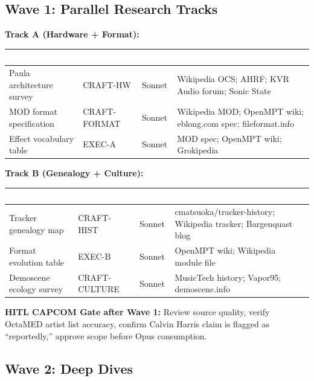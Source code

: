 \documentclass[11pt,letterpaper]{article}
\newcommand{\tableheader}[1]{\textbf{\sffamily\textcolor{white}{#1}}}
\begin{document}
\subsection{Wave 1: Parallel Research Tracks}

\textbf{Track A (Hardware + Format):}

\begin{center}
\begin{tabularx}{\textwidth}{L{3cm}L{2.5cm}C{2cm}X}
\toprule
{}
\tableheader{Task} & \tableheader{Agent} & \tableheader{Model} & \tableheader{Key Sources} \\
\midrule
Paula architecture survey & CRAFT-HW & Sonnet & Wikipedia OCS; AHRF; KVR Audio forum; Sonic State \\
MOD format specification & CRAFT-FORMAT & Sonnet & Wikipedia MOD; OpenMPT wiki; eblong.com spec; fileformat.info \\
Effect vocabulary table & EXEC-A & Sonnet & MOD spec; OpenMPT wiki; Grokipedia \\
\bottomrule
\end{tabularx}
\end{center}

\textbf{Track B (Genealogy + Culture):}

\begin{center}
\begin{tabularx}{\textwidth}{L{3cm}L{2.5cm}C{2cm}X}
\toprule
{}
\tableheader{Task} & \tableheader{Agent} & \tableheader{Model} & \tableheader{Key Sources} \\
\midrule
Tracker genealogy map & CRAFT-HIST & Sonnet & cmatsuoka/tracker-history; Wikipedia tracker; Bargenquast blog \\
Format evolution table & EXEC-B & Sonnet & OpenMPT wiki; Wikipedia module file \\
Demoscene ecology survey & CRAFT-CULTURE & Sonnet & MusicTech history; Vapor95; demoscene.info \\
\bottomrule
\end{tabularx}
\end{center}

\textbf{HITL CAPCOM Gate after Wave 1:} Review source quality, verify OctaMED artist list accuracy, confirm Calvin Harris claim is flagged as ``reportedly,'' approve scope before Opus consumption.

\subsection{Wave 2: Deep Dives}
\end{document}
